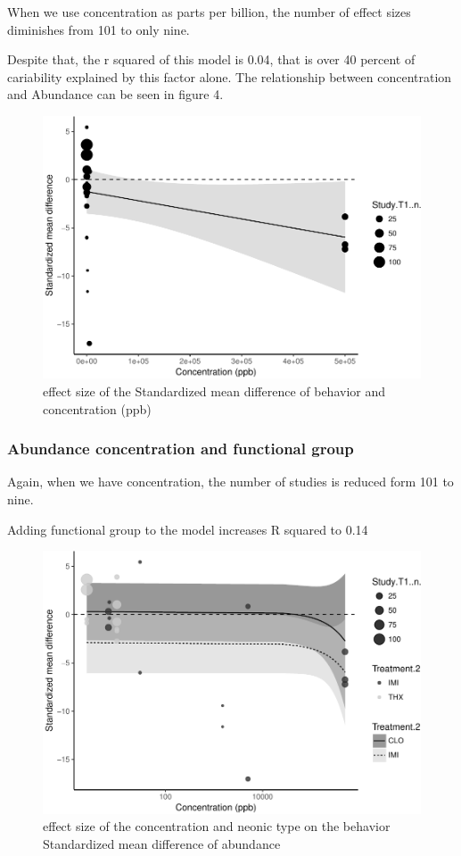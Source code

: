 \documentclass[]{elsarticle} %
\makeatletter
\def\maxwidth{\ifdim\Gin@nat@width>\linewidth\linewidth
\else\Gin@nat@width\fi}
\let\Oldincludegraphics\includegraphics
\renewcommand{\includegraphics}[1]{\Oldincludegraphics[width=\maxwidth]{#1}}
\makeatother
\begin{document}
When we use concentration as parts per billion, the number of effect
sizes diminishes from 101 to only nine.

Despite that, the r squared of this model is 0.04, that is over 40
percent of cariability explained by this factor alone. The relationship
between concentration and Abundance can be seen in figure 4.

\begin{figure}[htbp]
\centering
\includegraphics{MetanalysisNeonics_files/figure-latex/unnamed-chunk-22-1.pdf}
\caption{effect size of the Standardized mean difference of behavior and
concentration (ppb)}
\end{figure}

\subsubsection{Abundance concentration and functional
group}\label{abundance-concentration-and-functional-group-1}

Again, when we have concentration, the number of studies is reduced form
101 to nine.

Adding functional group to the model increases R squared to 0.14

\begin{figure}[htbp]
\centering
\includegraphics{MetanalysisNeonics_files/figure-latex/unnamed-chunk-24-1.pdf}
\caption{effect size of the concentration and neonic type on the
behavior Standardized mean difference of abundance}
\end{figure}
\end{document}
